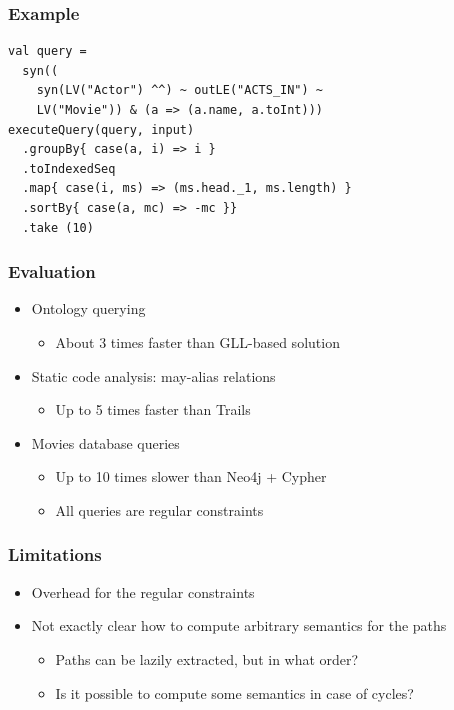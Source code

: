 \documentclass[xcolor=table]{beamer}
\begin{document}
\begin{frame}[fragile]
  \transwipe[direction=90]
  \frametitle{Example}
\begin{lstlisting}
val query =
  syn((
    syn(LV("Actor") ^^) ~ outLE("ACTS_IN") ~
    LV("Movie")) & (a => (a.name, a.toInt)))
executeQuery(query, input)
  .groupBy{ case(a, i) => i }
  .toIndexedSeq
  .map{ case(i, ms) => (ms.head._1, ms.length) }
  .sortBy{ case(a, mc) => -mc }}
  .take (10)
\end{lstlisting}
\end{frame}

          
\begin{frame}
  \transwipe[direction=90]
  \frametitle{Evaluation}         
\begin{itemize}
  \item Ontology querying 
  \begin{itemize} 
    \item About 3 times faster than GLL-based solution
  \end{itemize}
  \item Static code analysis: may-alias relations
  \begin{itemize} 
    \item Up to 5 times faster than Trails
  \end{itemize}
  \item Movies database queries 
  \begin{itemize}
    \item Up to 10 times slower than Neo4j + Cypher
    \item All queries are regular constraints
  \end{itemize}
\end{itemize}

\end{frame}     

\begin{frame}
  \transwipe[direction=90]
  \frametitle{Limitations}
\begin{itemize}
  \item Overhead for the regular constraints
  \item Not exactly clear how to compute arbitrary semantics for the paths
  \begin{itemize}
    \item Paths can be lazily extracted, but in what order?
    \item Is it possible to compute some semantics in case of cycles?
  \end{itemize}
\end{itemize}
\end{frame}
\end{document}
